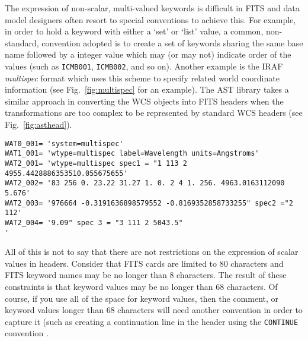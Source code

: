 \documentclass[final,authoryear,5p,times,twocolumn]{elsarticle}
\begin{document}
{{The expression of non-scalar, multi-valued keywords is difficult in 
FITS and data model designers often resort to special conventions to 
achieve this. For example, in order to hold a keyword with either a 
`set' or `list' value, a common, non-standard, convention adopted is 
to create a set of keywords sharing the same base name followed by a 
integer value which may (or may not) indicate order of the values 
(such as \texttt{ICMB001}, \texttt{ICMB002}, and so on). Another example 
is the IRAF \textit{multispec} format
\citep[see][and references therein]{1993ASPC...52..467V} which uses
this scheme to specify related world coordinate information (see 
Fig.~\ref{fig:multispec} for an example).  The AST library
\citep[][and see also \S\ref{sec:wcs}]{1998ASPC..145...41W} takes a
similar approach in converting the WCS objects into FITS headers when
the transformations are too complex to be represented by standard WCS
headers (see Fig.~\ref{fig:asthead}).

\begin{figure*}
\begin{minipage}{\textwidth}
\begin{center}
\begin{verbatim}
WAT0_001= 'system=multispec'
WAT1_001= 'wtype=multispec label=Wavelength units=Angstroms'
WAT2_001= 'wtype=multispec spec1 = "1 113 2 4955.4428886353510.055675655'
WAT2_002= '83 256 0. 23.22 31.27 1. 0. 2 4 1. 256. 4963.0163112090 5.676'
WAT2_003= '976664 -0.3191636898579552 -0.8169352858733255" spec2 ="2 112'
WAT2_004= '9.09" spec 3 = "3 111 2 5043.5"                              '
\end{verbatim}
\end{center}
\caption{Example header from an IRAF \textit{multispec} data set
  indicating the use of multi-line headers..}
\label{fig:multispec}
\end{minipage}
\end{figure*}

All of this is not to say that there are not restrictions on the expression
of scalar values in headers. Consider that FITS cards are limited to 80 
characters and FITS keyword names may be no longer than 8 characters. The 
result of these constraints is that keyword values may be no longer than 
68 characters. Of course, if you use all of the space for keyword values, 
then the comment, or keyword values longer than 68 characters will need 
another convention in order to capture it (such as creating a continuation
line in the header using the \texttt{CONTINUE} convention \citep{2007Continue}.

}}
\end{document}
